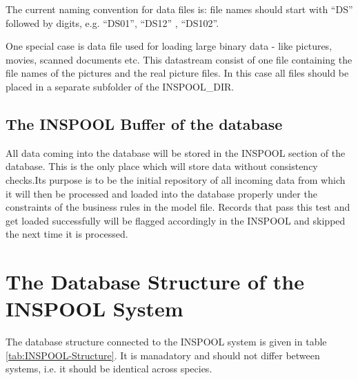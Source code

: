 The current naming convention for data files is: file names should
start with {}``DS'' followed by digits, e.g. {}``DS01'', {}``DS12''
, {}``DS102''.

One special case is data file used for loading large binary data -
like pictures, movies, scanned documents etc. This datastream consist
of one file containing the file names of the pictures and the real
picture files. In this case all files should be placed in a separate
subfolder of the INSPOOL\_DIR.


\subsection{The INSPOOL Buffer of the database}

All data coming into the database will be stored in the INSPOOL
section of the database. This is the only place which will store data
without consistency checks.Its purpose is to be the initial repository
of all incoming data from which it will then be processed and loaded
into the database properly under the constraints of the business rules
in the model file. Records that pass this test and get loaded successfully
will be flagged accordingly in the INSPOOL and skipped the next time
it is processed.


\section{The Database Structure of the INSPOOL System}

The database structure connected to the INSPOOL system is given in
table \ref{tab:INSPOOL-Structure}. It is manadatory and should not
differ between systems, i.e. it should be identical across species.

